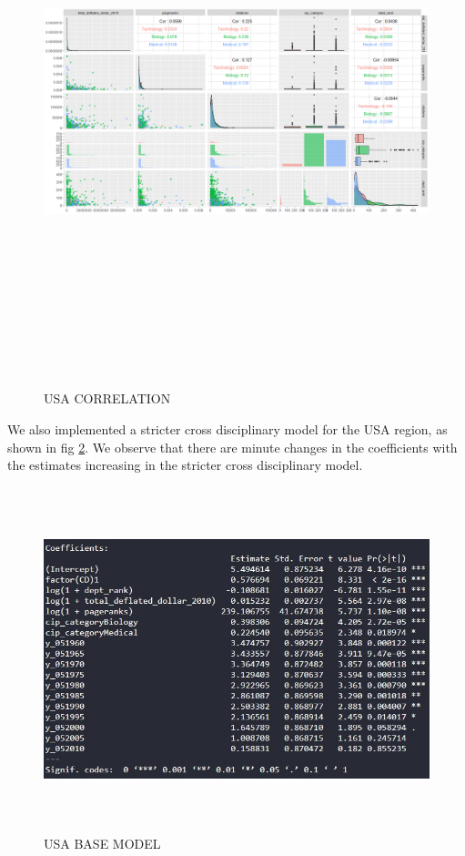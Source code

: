 \documentclass[a4paper,11pt]{article}
\theoremstyle{mytheor}
\begin{document}
\begin{figure}[h]
    \centering
    \includegraphics[width=16cm, height=16cm]{usa_nonstrict_cor.png}
    \caption{USA CORRELATION}
    \label{fig:USA CORRELATION}
\end{figure} 

We also implemented a stricter cross disciplinary model for the USA region, as shown in fig \ref{fig:USA BASE MODEL}. We observe that there are minute changes in the coefficients with the estimates increasing in the stricter cross disciplinary model. \newpage 

\begin{figure}[h]
    \centering
    \includegraphics[width=16cm, height=10cm]{usa_coeff_non.jpg}
    \caption{USA BASE MODEL}
    \label{fig:USA BASE MODEL}
\end{figure}
\FloatBarrier
\end{document}

